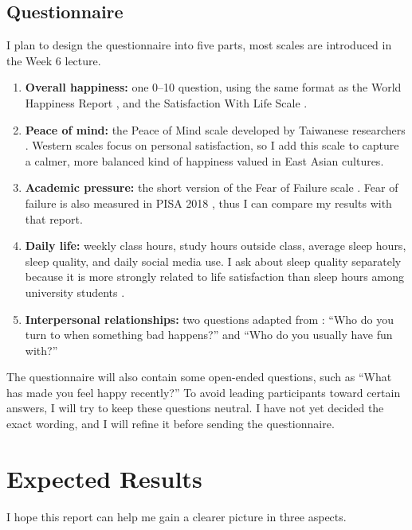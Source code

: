 \documentclass[12pt,a4paper]{article}
\begin{document}
\subsection{Questionnaire}
I plan to design the questionnaire into five parts, most scales are introduced in the Week 6 lecture.
\begin{enumerate}[label=(\roman*)]
  \item \textbf{Overall happiness:} one 0--10 question, using the same format as the World Happiness Report \parencite{helliwell2026world}, and the Satisfaction With Life Scale \parencite{diener1985satisfaction, wu2006analysis}.
  \item \textbf{Peace of mind:} the Peace of Mind scale developed by Taiwanese researchers \parencite{lee2013construct}. 
  Western scales focus on personal satisfaction, so I add this scale to capture a calmer, more balanced kind of happiness valued in East Asian cultures.
  \item \textbf{Academic pressure:} the short version of the Fear of Failure scale \parencite{conroy2002multidimensional}. 
  Fear of failure is also measured in PISA 2018 \parencite{oecd2019pisa}, thus I can compare my results with that report.
  \item \textbf{Daily life:} weekly class hours, study hours outside class, average sleep hours, sleep quality, and daily social media use. 
  I ask about sleep quality separately because it is more strongly related to life satisfaction than sleep hours among university students \parencite{pilcher1997sleep}.
  \item \textbf{Interpersonal relationships:} two questions adapted from
        \parencite{morelli2017empathy}: ``Who do you turn to when something bad
        happens?'' and ``Who do you usually have fun with?''
\end{enumerate}

The questionnaire will also contain some open-ended questions, such as ``What has made you feel happy recently?''
To avoid leading participants toward certain answers, I will try to keep these questions neutral. 
I have not yet decided the exact wording, and I will refine it before sending the questionnaire.

\section{Expected Results}

I hope this report can help me gain a clearer picture in three aspects.
\end{document}
